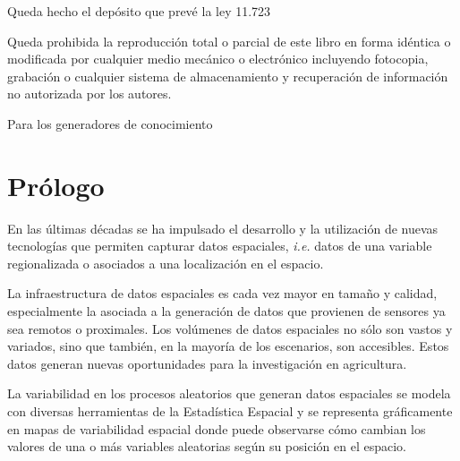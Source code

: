 \documentclass[11pt,b5paper,]{krantz}
\begin{document}
Queda hecho el depósito que prevé la ley 11.723



\bigskip
\small{
Queda prohibida la reproducción total o parcial de este libro en forma idéntica o modificada por cualquier medio mecánico o electrónico incluyendo fotocopia, grabación o cualquier sistema de almacenamiento y recuperación de información no autorizada por los autores.
}

\newpage

\hfill	\large{Para los generadores de conocimiento} 


\setlength{\abovedisplayskip}{-3pt}
\setlength{\abovedisplayshortskip}{-3pt}

{
\hypersetup{linkcolor=}
\setcounter{tocdepth}{2}
\tableofcontents
}
\hypertarget{pruxf3logo}{%
\chapter*{Prólogo}\label{pruxf3logo}}


En las últimas décadas se ha impulsado el desarrollo y la utilización de nuevas tecnologías que permiten capturar datos espaciales, \emph{i.e.} datos de una variable regionalizada o asociados a una localización en el espacio.

La infraestructura de datos espaciales es cada vez mayor en tamaño y calidad, especialmente la asociada a la generación de datos que provienen de sensores ya sea remotos o proximales. Los volúmenes de datos espaciales no sólo son vastos y variados, sino que también, en la mayoría de los escenarios, son accesibles. Estos datos generan nuevas oportunidades para la investigación en agricultura.

La variabilidad en los procesos aleatorios que generan datos espaciales se modela con diversas herramientas de la Estadística Espacial y se representa gráficamente en mapas de variabilidad espacial donde puede observarse cómo cambian los valores de una o más variables aleatorias según su posición en el espacio.
\end{document}
